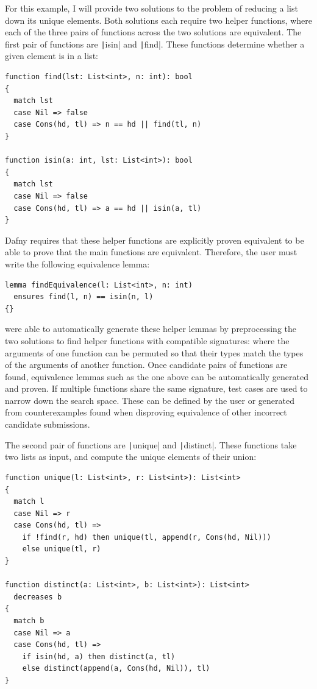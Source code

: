 For this example, I will provide two solutions to the problem of reducing a list down its unique elements. Both solutions each require two helper functions, where each of the three pairs of functions across the two solutions are equivalent. The first pair of functions are \texttt|isin| and \texttt|find|. These functions determine whether a given element is in a list:
\begin{verbatim}
function find(lst: List<int>, n: int): bool
{
  match lst
  case Nil => false
  case Cons(hd, tl) => n == hd || find(tl, n)
}

function isin(a: int, lst: List<int>): bool
{
  match lst
  case Nil => false
  case Cons(hd, tl) => a == hd || isin(a, tl)
}
\end{verbatim}
%
Dafny requires that these helper functions are explicitly proven equivalent to be able to prove that the main functions are equivalent. Therefore, the user must write the following equivalence lemma:
\begin{verbatim}
lemma findEquivalence(l: List<int>, n: int)
  ensures find(l, n) == isin(n, l)
{}
\end{verbatim}
%
\textcite{milovancevicProvingDisprovingEquivalence2023} were able to automatically generate these helper lemmas by preprocessing the two solutions to find helper functions with compatible signatures: where the arguments of one function can be permuted so that their types match the types of the arguments of another function. Once candidate pairs of functions are found, equivalence lemmas such as the one above can be automatically generated and proven. If multiple functions share the same signature, test cases are used to narrow down the search space. These can be defined by the user or generated from counterexamples found when disproving equivalence of other incorrect candidate submissions.

The second pair of functions are \texttt|unique| and \texttt|distinct|. These functions take two lists as input, and compute the unique elements of their union:

\begin{verbatim}
function unique(l: List<int>, r: List<int>): List<int>
{
  match l
  case Nil => r
  case Cons(hd, tl) =>
    if !find(r, hd) then unique(tl, append(r, Cons(hd, Nil)))
    else unique(tl, r)
}

function distinct(a: List<int>, b: List<int>): List<int>
  decreases b
{
  match b
  case Nil => a
  case Cons(hd, tl) =>
    if isin(hd, a) then distinct(a, tl)
    else distinct(append(a, Cons(hd, Nil)), tl)
}
\end{verbatim}
%

